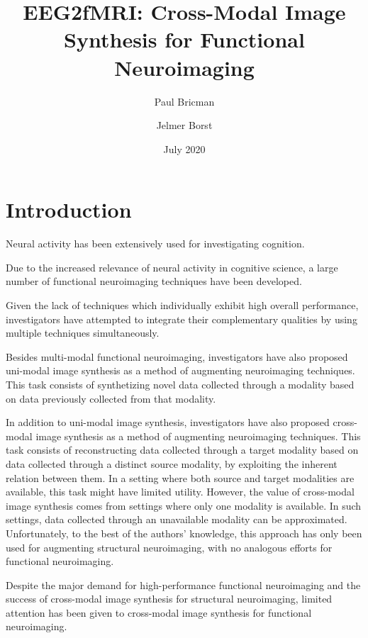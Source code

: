 \documentclass{article}
\title{EEG2fMRI: Cross-Modal Image Synthesis for Functional Neuroimaging}
\author{Paul Bricman}
\author{Jelmer Borst}
\affil{University of Groningen}
\date{July 2020}
\begin{document}
\maketitle

\section{Introduction}

Neural activity has been extensively used for investigating cognition.

Due to the increased relevance of neural activity in cognitive science, a large number of functional neuroimaging techniques have been developed.

Given the lack of techniques which individually exhibit high overall performance, investigators have attempted to integrate their complementary qualities by using multiple techniques simultaneously.

Besides multi-modal functional neuroimaging, investigators have also proposed uni-modal image synthesis as a method of augmenting neuroimaging techniques. This task consists of synthetizing novel data collected through a modality based on data previously collected from that modality.

In addition to uni-modal image synthesis, investigators have also proposed cross-modal image synthesis as a method of augmenting neuroimaging techniques. This task consists of reconstructing data collected through a target modality based on data collected through a distinct source modality, by exploiting the inherent relation between them. In a setting where both source and target modalities are available, this task might have limited utility. However, the value of cross-modal image synthesis comes from settings where only one modality is available. In such settings, data collected through an unavailable modality can be approximated. Unfortunately, to the best of the authors' knowledge, this approach has only been used for augmenting structural neuroimaging, with no analogous efforts for functional neuroimaging.

Despite the major demand for high-performance functional neuroimaging and the success of cross-modal image synthesis for structural neuroimaging, limited attention has been given to cross-modal image synthesis for functional neuroimaging.
\end{document}
